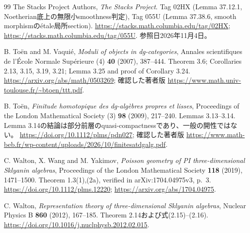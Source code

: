\begin{thebibliography}{99}
The Stacks Project Authors, \emph{The Stacks Project}.
Tag 02HX (Lemma 37.12.1, Noetherian底上の無限小smoothness判定),
Tag 055U (Lemma 37.38.6, smooth morphismのétale局所section).
\url{https://stacks.math.columbia.edu/tag/02HX};
\url{https://stacks.math.columbia.edu/tag/055U}.
参照日2026年11月4日。

B. Toën and M. Vaquié,
\emph{Moduli of objects in dg-categories},
Annales scientifiques de l'École Normale Supérieure (4) \textbf{40} (2007), 387--444.
Theorem 3.6; Corollaries 2.13, 3.15, 3.19, 3.21; Lemma 3.25 and proof of Corollary 3.24.
\url{https://arxiv.org/abs/math/0503269};
確認した著者版 \url{https://www.math.univ-toulouse.fr/~btoen/ttt.pdf}.

B. Toën, \emph{Finitude homotopique des dg-algèbres propres et lisses},
Proceedings of the London Mathematical Society (3) \textbf{98} (2009), 217--240.
Lemmas 3.13--3.14. Lemma 3.14の結論は部分前層のquasi-compactnessであり、一般の開性ではない。
\url{https://doi.org/10.1112/plms/pdn027};
確認した著者版 \url{https://www.math-beb.fr/wp-content/uploads/2026/10/finitesatdgalg.pdf}.

C. Walton, X. Wang and M. Yakimov,
\emph{Poisson geometry of PI three-dimensional Sklyanin algebras},
Proceedings of the London Mathematical Society \textbf{118} (2019), 1471--1500.
Theorem 1.3(1),(2a), verified in arXiv:1704.04975v3, p.~3.
\url{https://doi.org/10.1112/plms.12220};
\url{https://arxiv.org/abs/1704.04975}.

C. Walton, \emph{Representation theory of three-dimensional Sklyanin algebras},
Nuclear Physics B \textbf{860} (2012), 167--185.
Theorem 2.14および式(2.15)--(2.16).
\url{https://doi.org/10.1016/j.nuclphysb.2012.02.015}.
\end{thebibliography}
